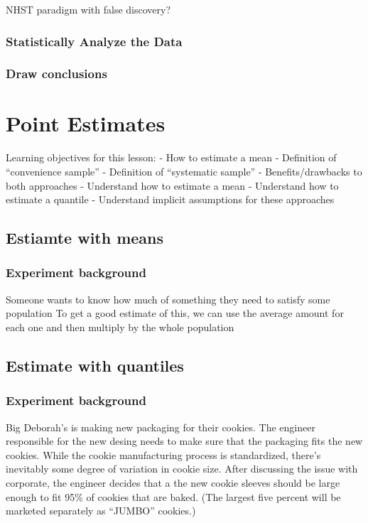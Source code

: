 \documentclass[]{book}
\theoremstyle{definition}
\theoremstyle{definition}
\theoremstyle{definition}
\theoremstyle{remark}
\begin{document}
NHST paradigm with false discovery?

\subsection{Statistically Analyze the
Data}\label{statistically-analyze-the-data-1}

\subsection{Draw conclusions}\label{draw-conclusions-1}

\chapter{Point Estimates}\label{point-estimates}

Learning objectives for this lesson: - How to estimate a mean -
Definition of ``convenience sample'' - Definition of ``systematic
sample'' - Benefits/drawbacks to both approaches - Understand how to
estimate a mean - Understand how to estimate a quantile - Understand
implicit assumptions for these approaches

\section{Estiamte with means}\label{estiamte-with-means}

\subsection{Experiment background}\label{experiment-background-2}

Someone wants to know how much of something they need to satisfy some
population To get a good estimate of this, we can use the average amount
for each one and then multiply by the whole population

\section{Estimate with quantiles}\label{estimate-with-quantiles}

\subsection{Experiment background}\label{experiment-background-3}

Big Deborah's is making new packaging for their cookies. The engineer
responsible for the new desing needs to make sure that the packaging
fits the new cookies. While the cookie manufacturing process is
standardized, there's inevitably some degree of variation in cookie
size. After discussing the issue with corporate, the engineer decides
that a the new cookie sleeves should be large enough to fit 95\% of
cookies that are baked. (The largest five percent will be marketed
separately as ``JUMBO'' cookies.)
\end{document}
